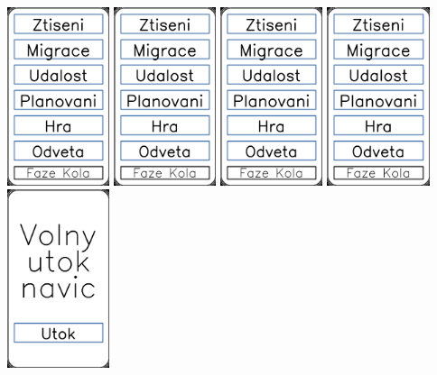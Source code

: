 \documentclass[a4paper]{article}
\begin{document}
	\includegraphics[width=3.0cm]{img-8_0}
	\includegraphics[width=3.0cm]{img-8_1}
	\includegraphics[width=3.0cm]{img-8_2}
	\includegraphics[width=3.0cm]{img-8_3}
	\includegraphics[width=3.0cm]{img-9_0}
\end{document}
